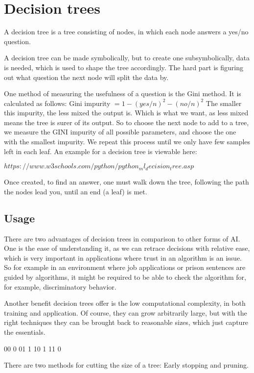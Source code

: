 \section{Decision trees}
\label{sec:decisionTrees}
A decision tree is a tree consisting of nodes, in which each node answers a yes/no question. 

A decision tree can be made symbolically, but to create one subsymbolically, data is needed, which is used to shape the tree accordingly.
The hard part is figuring out what question the next node will split the data by. 

One method of measuring the usefulness of a question is the Gini method.
It is calculated as follows: Gini impurity $= 1-(yes/n)^2-(no/n)^2$ 
The smaller this impurity, the less mixed the output is. Which is what we want, as less mixed means the tree is surer of its output. 
So to choose the next node to add to a tree, we measure the GINI impurity of all possible parameters, and choose the one with the smallest impurity. We repeat this process until we only have few samples left in each leaf. 
An example for a decision tree is viewable here: %

$https://www.w3schools.com/python/python_ml_decision_tree.asp$

Once created, to find an answer, one must walk down the tree, following the path the nodes lead you, until an end (a leaf) is met.

\subsection{Usage}
There are two advantages of decision trees in comparison to other forms of AI. One is the ease of understanding it, as we can retrace decisions with relative ease, which is very important in applications where trust in an algorithm is an issue. So for example in an environment where job applications or prison sentences are guided by algorithms, it might be required to be able to check the algorithm for, for example, discriminatory behavior.

Another benefit decision trees offer is the low computational complexity, in both training and application. Of course, they can grow arbitrarily large, but with the right techniques they can be brought back to reasonable sizes, which just capture the essentials.

00 0
01 1
10 1
11 0

There are two methods for cutting the size of a tree: Early stopping and pruning. 

